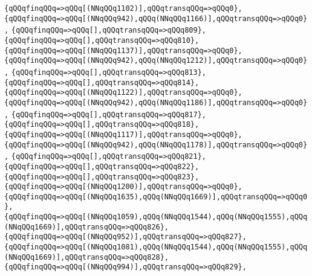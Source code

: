 \verb|{qQQqfinqQQq=>qQQq[(NNqQQq1102)],qQQqtransqQQq=>qQQq0},|\newline
\verb|{qQQqfinqQQq=>qQQq[(NNqQQq942),qQQq(NNqQQq1166)],qQQqtransqQQq=>qQQq0},|\newline
\verb|{qQQqfinqQQq=>qQQq[],qQQqtransqQQq=>qQQq809},|\newline
\verb|{qQQqfinqQQq=>qQQq[],qQQqtransqQQq=>qQQq810},|\newline
\verb|{qQQqfinqQQq=>qQQq[(NNqQQq1137)],qQQqtransqQQq=>qQQq0},|\newline
\verb|{qQQqfinqQQq=>qQQq[(NNqQQq942),qQQq(NNqQQq1212)],qQQqtransqQQq=>qQQq0},|\newline
\verb|{qQQqfinqQQq=>qQQq[],qQQqtransqQQq=>qQQq813},|\newline
\verb|{qQQqfinqQQq=>qQQq[],qQQqtransqQQq=>qQQq814},|\newline
\verb|{qQQqfinqQQq=>qQQq[(NNqQQq1122)],qQQqtransqQQq=>qQQq0},|\newline
\verb|{qQQqfinqQQq=>qQQq[(NNqQQq942),qQQq(NNqQQq1186)],qQQqtransqQQq=>qQQq0},|\newline
\verb|{qQQqfinqQQq=>qQQq[],qQQqtransqQQq=>qQQq817},|\newline
\verb|{qQQqfinqQQq=>qQQq[],qQQqtransqQQq=>qQQq818},|\newline
\verb|{qQQqfinqQQq=>qQQq[(NNqQQq1117)],qQQqtransqQQq=>qQQq0},|\newline
\verb|{qQQqfinqQQq=>qQQq[(NNqQQq942),qQQq(NNqQQq1178)],qQQqtransqQQq=>qQQq0},|\newline
\verb|{qQQqfinqQQq=>qQQq[],qQQqtransqQQq=>qQQq821},|\newline
\verb|{qQQqfinqQQq=>qQQq[],qQQqtransqQQq=>qQQq822},|\newline
\verb|{qQQqfinqQQq=>qQQq[],qQQqtransqQQq=>qQQq823},|\newline
\verb|{qQQqfinqQQq=>qQQq[(NNqQQq1200)],qQQqtransqQQq=>qQQq0},|\newline
\verb|{qQQqfinqQQq=>qQQq[(NNqQQq1635),qQQq(NNqQQq1669)],qQQqtransqQQq=>qQQq0},|\newline
\verb|{qQQqfinqQQq=>qQQq[(NNqQQq1059),qQQq(NNqQQq1544),qQQq(NNqQQq1555),qQQq(NNqQQq1669)],qQQqtransqQQq=>qQQq826},|\newline
\verb|{qQQqfinqQQq=>qQQq[(NNqQQq952)],qQQqtransqQQq=>qQQq827},|\newline
\verb|{qQQqfinqQQq=>qQQq[(NNqQQq1081),qQQq(NNqQQq1544),qQQq(NNqQQq1555),qQQq(NNqQQq1669)],qQQqtransqQQq=>qQQq828},|\newline
\verb|{qQQqfinqQQq=>qQQq[(NNqQQq994)],qQQqtransqQQq=>qQQq829},|\newline
